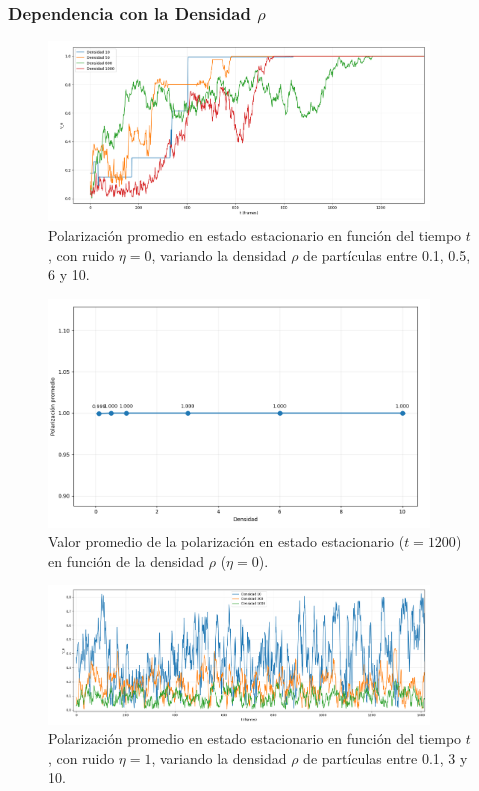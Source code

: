 \documentclass{article}
\begin{document}
\subsubsection{Dependencia con la Densidad $\rho$}

\begin{figure}[H]
\centering
\includegraphics[width=0.9\textwidth]{Voter Ruido 0 variando densidad.png}
\caption{Polarización promedio en estado estacionario en función del tiempo $t$, con ruido $\eta = 0$, variando la densidad $\rho$ de partículas entre 0.1, 0.5, 6 y 10.}
\label{fig:promedio_va_densidad_voter0}
\end{figure}

\begin{figure}[H]
\centering
\includegraphics[width=0.9\textwidth]{Voter Ruido 0 variando densidad avg.png}
\caption{Valor promedio de la polarización en estado estacionario ($t  = 1200$) en función de la densidad $\rho$ ($\eta = 0$).}
\label{fig:va_tiempo_densidad_voter0}
\end{figure}

\begin{figure}[H]
\centering
\includegraphics[width=0.9\textwidth]{Voter Ruido 1 variando densidad.png}
\caption{Polarización promedio en estado estacionario en función del tiempo $t$, con ruido $\eta = 1$, variando la densidad $\rho$ de partículas entre 0.1, 3 y 10.}
\label{fig:promedio_va_densidad_voter1}
\end{figure}
\end{document}
